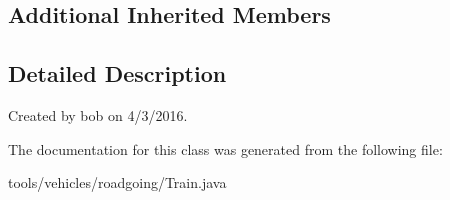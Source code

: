\subsection*{Additional Inherited Members}


\subsection{Detailed Description}
Created by bob on 4/3/2016. 

The documentation for this class was generated from the following file\+:\begin{DoxyCompactItemize}
\item 
tools/vehicles/roadgoing/Train.\+java\end{DoxyCompactItemize}

